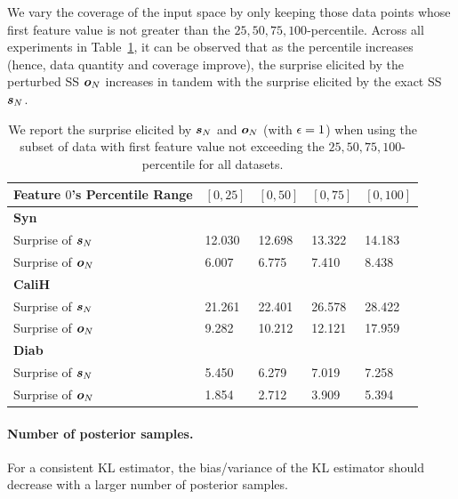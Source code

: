 \documentclass{article}
\theoremstyle{plain}
\theoremstyle{definition}
\theoremstyle{remark}
\begin{document}
We vary the coverage of the input space by only keeping those data points whose first feature value is not greater than the $25,50,75,100$-percentile. Across all experiments in Table~\ref{tab:coverage}, it can be observed that as the percentile increases (hence, data quantity and coverage improve), the surprise elicited by the perturbed SS ${\bm{o}}_N$ increases in tandem with the surprise elicited by the exact SS ${\bm{s}}_N$.

\begin{table}[H]
\centering
\begin{tabular}{@{}lllll@{}}
\toprule
Feature $0$'s Percentile Range               & $[0,25]$ & $[0,50]$ & $[0,75]$ & $[0,100]$ \\ \midrule
\textbf{Syn} &          &          &          &           \\
Surprise of ${\bm{s}}_N$                     & 12.030   & 12.698   & 13.322   & 14.183    \\
Surprise of ${\bm{o}}_N$                     & 6.007    & 6.775    & 7.410    & 8.438     \\
\textbf{CaliH}         &          &          &          &           \\
Surprise of ${\bm{s}}_N$                     & 21.261   & 22.401   & 26.578   & 28.422    \\
Surprise of ${\bm{o}}_N$                     & 9.282    & 10.212   & 12.121   & 17.959    \\
\textbf{Diab}      &          &          &          &           \\
Surprise of ${\bm{s}}_N$                     & 5.450    & 6.279    & 7.019    & 7.258     \\
Surprise of ${\bm{o}}_N$                     & 1.854    & 2.712    & 3.909    & 5.394     \\ \bottomrule
\end{tabular}
\caption{We report the surprise elicited by ${\bm{s}}_N$ and ${\bm{o}}_N$ (with ${\epsilon}=1$) when using the subset of data with first feature value not exceeding the $25,50,75,100$-percentile for all datasets.}
\label{tab:coverage}
\end{table}

\paragraph{Number of posterior samples.}
For a consistent KL estimator, the bias/variance of the KL estimator should decrease with a larger number of posterior samples.
\end{document}
